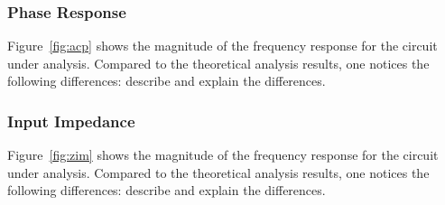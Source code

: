 \lipsum[1-1]

\subsubsection{Phase Response}

Figure~\ref{fig:acp} shows the magnitude of the frequency response for the
circuit under analysis. Compared to the theoretical analysis results, one
notices the following differences: describe and explain the differences.



\lipsum[1-1]

\subsubsection{Input Impedance}

Figure~\ref{fig:zim} shows the magnitude of the frequency response for the
circuit under analysis. Compared to the theoretical analysis results, one
notices the following differences: describe and explain the differences.



\lipsum[1-1]



